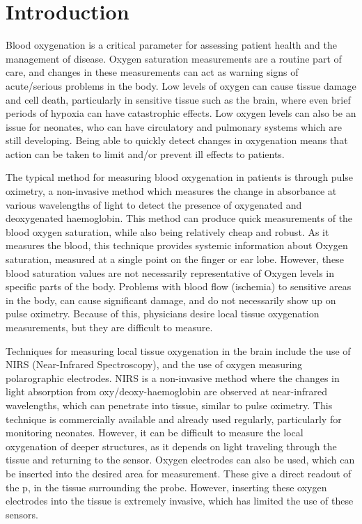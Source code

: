 \chapter{Introduction}\label{ch:intro}

Blood oxygenation is a critical parameter for assessing patient health and the management of disease.
Oxygen saturation measurements are a routine part of care, and changes in these measurements can act as warning signs of acute/serious problems in the body.
Low levels of oxygen can cause tissue damage and cell death, particularly in sensitive tissue such as the brain, where even brief periods of hypoxia can have catastrophic effects.
Low oxygen levels can also be an issue for neonates, who can have circulatory and pulmonary systems which are still developing.
Being able to quickly detect changes in oxygenation means that action can be taken to limit and/or prevent ill effects to patients.

The typical method for measuring blood oxygenation in patients is through pulse oximetry, a non-invasive method which measures the change in absorbance at various wavelengths of light to detect the presence of oxygenated and deoxygenated haemoglobin.
This method can produce quick measurements of the blood oxygen saturation, while also being relatively cheap and robust.
As it measures the blood, this technique provides systemic information about Oxygen saturation, measured at a single point on the finger or ear lobe.
However, these blood saturation values are not necessarily representative of Oxygen levels in specific parts of the body.
Problems with blood flow (ischemia) to sensitive areas in the body, can cause significant damage, and do not necessarily show up on pulse oximetry.
Because of this, physicians desire local tissue oxygenation measurements, but they are difficult to measure.

Techniques for measuring local tissue oxygenation in the brain include the use of NIRS (Near-Infrared Spectroscopy), and the use of oxygen measuring
polarographic electrodes.
NIRS is a non-invasive method where the changes in light absorption from oxy/deoxy-haemoglobin are observed at near-infrared wavelengths, which can penetrate
into tissue, similar to pulse oximetry.
This technique is commercially available and already used regularly, particularly for monitoring neonates.
However, it can be difficult to measure the local oxygenation of deeper structures, as it depends on light traveling through the tissue and returning to the sensor.
Oxygen electrodes can also be used, which can be inserted into the desired area for measurement.
These give a direct readout of the p\Otwo, in the tissue surrounding the probe.
However, inserting these oxygen electrodes into the tissue is extremely invasive, which has limited the use of these sensors.

